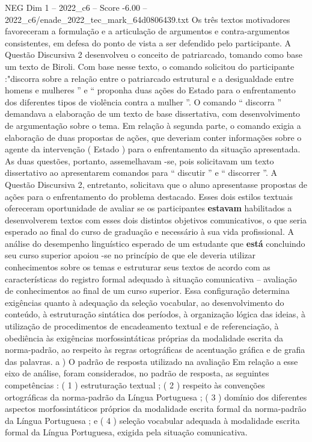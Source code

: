 \begin{textsample}{NEG Dim 1 – 2022\_c6 – Score -6.00 – 2022\_c6/enade\_2022\_tec\_mark\_64d0806439.txt}
Os três textos motivadores favoreceram a formulação e a articulação de argumentos e contra-argumentos consistentes, em defesa do ponto de vista a ser defendido pelo participante.
A Questão Discursiva 2 desenvolveu o conceito de patriarcado, tomando como base um texto de Biroli.
Com base nesse texto, o comando solicitou do participante :"discorra sobre a relação entre o patriarcado estrutural e a desigualdade entre homens e mulheres ” e “ proponha duas ações do Estado para o enfrentamento dos diferentes tipos de violência contra a mulher ”.
O comando “ discorra ” demandava a elaboração de um texto de base dissertativa, com desenvolvimento de argumentação sobre o tema.
Em relação à segunda parte, o comando exigia a elaboração de duas propostas de ações, que deveriam conter informações sobre o agente da intervenção ( Estado ) para o enfrentamento da situação apresentada.
As duas questões, portanto, assemelhavam -se, pois solicitavam um texto dissertativo ao apresentarem comandos para “ discutir ” e “ discorrer ”.
A Questão Discursiva 2, entretanto, solicitava que o aluno apresentasse propostas de ações para o enfrentamento do problema destacado.
Esses dois estilos textuais ofereceram oportunidade de avaliar se os participantes \textbf{estavam} habilitados a desenvolverem textos com esses dois distintos objetivos comunicativos, o que seria esperado ao final do curso de graduação e necessário à sua vida profissional.
A análise do desempenho linguístico esperado de um estudante que \textbf{está} concluindo seu curso superior apoiou -se no princípio de que ele deveria utilizar conhecimentos sobre os temas e estruturar seus textos de acordo com as características do registro formal adequado à situação comunicativa – avaliação de conhecimentos ao final de um curso superior.
Essa configuração determina exigências quanto à adequação da seleção vocabular, ao desenvolvimento do conteúdo, à estruturação sintática dos períodos, à organização lógica das ideias, à utilização de procedimentos de encadeamento textual e de referenciação, à obediência às exigências morfossintáticas próprias da modalidade escrita da norma-padrão, ao respeito às regras ortográficas de acentuação gráfica e de grafia das palavras. a ) O padrão de resposta utilizado na avaliação Em relação a esse eixo de análise, foram considerados, no padrão de resposta, as seguintes competências : ( 1 ) estruturação textual ; ( 2 ) respeito às convenções ortográficas da norma-padrão da Língua Portuguesa ; ( 3 ) domínio dos diferentes aspectos morfossintáticos próprios da modalidade escrita formal da norma-padrão da Língua Portuguesa ; e ( 4 ) seleção vocabular adequada à modalidade escrita formal da Língua Portuguesa, exigida pela situação comunicativa.

\end{textsample}
